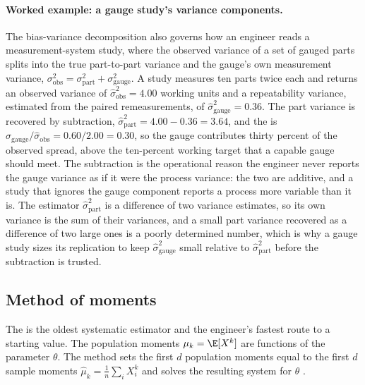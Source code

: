 \paragraph{Worked example: a gauge study's variance components.} The
bias-variance decomposition also governs how an engineer reads a
measurement-system study, where the observed variance of a set of
gauged parts splits into the true part-to-part variance and the gauge's
own measurement variance, $\sigma_{\mathrm{obs}}^{2} =
\sigma_{\mathrm{part}}^{2} + \sigma_{\mathrm{gauge}}^{2}$. A study
measures ten parts twice each and returns an observed variance of
$\hat{\sigma}_{\mathrm{obs}}^{2} = 4.00$ working units and a
repeatability variance, estimated from the paired remeasurements, of
$\hat{\sigma}_{\mathrm{gauge}}^{2} = 0.36$. The part variance is
recovered by subtraction, $\hat{\sigma}_{\mathrm{part}}^{2} = 4.00 -
0.36 = 3.64$, and the  is
$\hat{\sigma}_{\mathrm{gauge}}/\hat{\sigma}_{\mathrm{obs}} =
0.60/2.00 = 0.30$, so the gauge contributes thirty percent of the
observed spread, above the ten-percent working target that a capable
gauge should meet. The subtraction is the operational reason the
engineer never reports the gauge variance as if it were the process
variance: the two are additive, and a study that ignores the gauge
component reports a process more variable than it is. The estimator
$\hat{\sigma}_{\mathrm{part}}^{2}$ is a difference of two variance
estimates, so its own variance is the sum of their variances, and a
small part variance recovered as a difference of two large ones is a
poorly determined number, which is why a gauge study sizes its
replication to keep $\hat{\sigma}_{\mathrm{gauge}}^{2}$ small relative
to $\hat{\sigma}_{\mathrm{part}}^{2}$ before the subtraction is trusted.

\subsection{Method of moments}

The  is the oldest systematic estimator
and the engineer's fastest route to a starting value. The
population moments $\mu_{k} = \E[X^{k}]$ are functions of the
parameter $\theta$. The method sets the first $d$ population
moments equal to the first $d$ sample moments $\hat{\mu}_{k} =
\frac{1}{n}\sum_{i} X_{i}^{k}$ and solves the resulting system for
$\theta$ \cite[ch.~9]{text:wasserman2004}.

